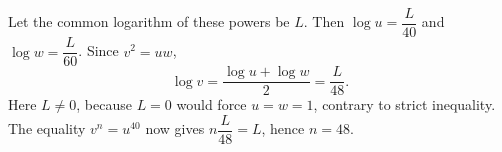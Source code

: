 Let the common logarithm of these powers be $L$. Then $\log u=\dfrac{L}{40}$ and $\log w=\dfrac{L}{60}$. Since $v^2=uw$,
\[\log v=\dfrac{\log u+\log w}{2}=\dfrac{L}{48}.\]
Here $L\ne0$, because $L=0$ would force $u=w=1$, contrary to strict inequality. The equality $v^n=u^{40}$ now gives $n\dfrac{L}{48}=L$, hence $\boxed{n=48}$.
